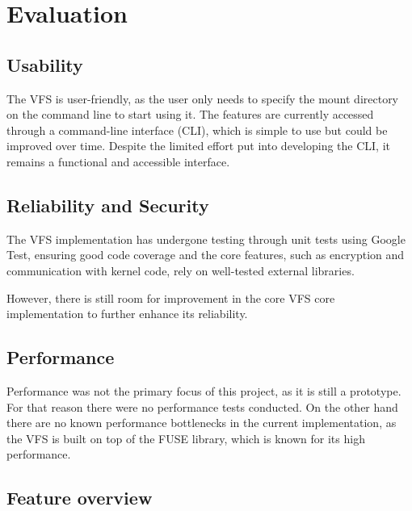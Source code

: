 \section{Evaluation}\label{sec:evaluation}


\subsection{Usability}\label{subsec:usability}

The VFS is user-friendly, as the user only needs to specify the mount directory on the command line to start using it.
The features are currently accessed through a command-line interface (CLI), which is simple to use but could be improved over time.
Despite the limited effort put into developing the CLI, it remains a functional and accessible interface.

\subsection{Reliability and Security}\label{subsec:reliability-and-security}

The VFS implementation has undergone testing through unit tests using Google Test, ensuring good code coverage and the core features, such as encryption and communication with kernel code, rely on well-tested external libraries.

However, there is still room for improvement in the core VFS core implementation to further enhance its reliability.

\subsection{Performance}\label{subsec:performance}

Performance was not the primary focus of this project, as it is still a prototype.
For that reason there were no performance tests conducted.
On the other hand there are no known performance bottlenecks in the current implementation, as the VFS is built on top of the FUSE library, which is known for its high performance.

\subsection{Feature overview}\label{subsec:feature-overview}

\xxx{\ldots}